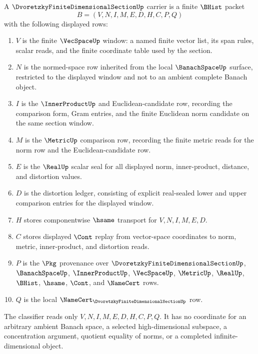 \begin{definition}
\label{def:dvoretzky-finite-dimensional-section-carrier}
A $\DvoretzkyFiniteDimensionalSectionUp$ carrier is a finite $\BHist$ packet
$$
B=(V,N,I,M,E,D,H,C,P,Q)
$$
with the following displayed rows:
\begin{enumerate}
\item $V$ is the finite $\VecSpaceUp$ window: a named finite vector list, its span rules, scalar reads, and the finite coordinate table used by the section.
\item $N$ is the normed-space row inherited from the local $\BanachSpaceUp$ surface, restricted to the displayed window and not to an ambient complete Banach object.
\item $I$ is the $\InnerProductUp$ and Euclidean-candidate row, recording the comparison form, Gram entries, and the finite Euclidean norm candidate on the same section window.
\item $M$ is the $\MetricUp$ comparison row, recording the finite metric reads for the norm row and the Euclidean-candidate row.
\item $E$ is the $\RealUp$ scalar seal for all displayed norm, inner-product, distance, and distortion values.
\item $D$ is the distortion ledger, consisting of explicit real-sealed lower and upper comparison entries for the displayed window.
\item $H$ stores componentwise $\hsame$ transport for $V,N,I,M,E,D$.
\item $C$ stores displayed $\Cont$ replay from vector-space coordinates to norm, metric, inner-product, and distortion reads.
\item $P$ is the $\Pkg$ provenance over $\DvoretzkyFiniteDimensionalSectionUp$, $\BanachSpaceUp$, $\InnerProductUp$, $\VecSpaceUp$, $\MetricUp$, $\RealUp$, $\BHist$, $\hsame$, $\Cont$, and $\NameCert$ rows.
\item $Q$ is the local $\NameCert_{\DvoretzkyFiniteDimensionalSectionUp}$ row.
\end{enumerate}
The classifier reads only $V,N,I,M,E,D,H,C,P,Q$. It has no coordinate for an arbitrary ambient Banach space, a selected high-dimensional subspace, a concentration argument, quotient equality of norms, or a completed infinite-dimensional object.
\end{definition}

